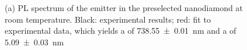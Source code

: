 			\begin{figure}[tp]
				\begin{subfigure}[t]{ 0.49\linewidth}
					\centering
					\label{subfig::spectrum_nd_multiple}
					\caption{}
				\end{subfigure}
				\hfill
				\begin{subfigure}[t]{ 0.49\linewidth}
					\centering
					\caption{}
					\label{subfig::spectrum_antenna_no_nd}
				\end{subfigure}
				\caption{(a) PL spectrum of the emitter in the preselected nanodiamond at room temperature. Black: experimental results; red: fit to experimental data, which yields a \ZPL \cwl of \SI{738.55\pm0.01}{nm} and a \lw of  \SI{5.09\pm0.03}{nm}}
			\end{figure}

